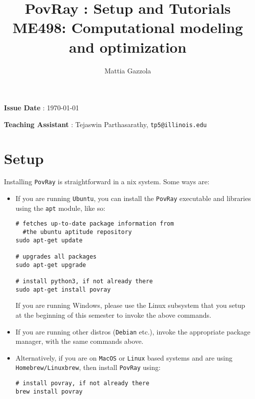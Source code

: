 \documentclass[11pt]{article}
\author{Mattia Gazzola}
\date{}
\title{PovRay : Setup and Tutorials\\\medskip
\large ME498: Computational modeling and optimization}
\begin{document}
\maketitle
\textbf{Issue Date} : \today

\textbf{Teaching Assistant} : Tejaswin Parthasarathy, \texttt{tp5@illinois.edu}

\section{Setup}
\label{sec:org9167742}
Installing \texttt{PovRay} is straightforward in a nix system. Some ways are:

\begin{itemize}
\item If you are running \texttt{Ubuntu}, you can install the \texttt{PovRay} executable and
libraries using the \texttt{apt} module, like so:

\begin{verbatim}
# fetches up-to-date package information from
  #the ubuntu aptitude repository
sudo apt-get update

# upgrades all packages
sudo apt-get upgrade

# install python3, if not already there
sudo apt-get install povray
\end{verbatim}
If you are running Windows, please use the Linux subsystem that you setup at
the beginning of this semester to invoke the above commands.

\item If you are running other distros (\texttt{Debian} etc.), invoke the appropriate package
manager, with the same commands above.

\item Alternatively, if you are on \texttt{MacOS} or \texttt{Linux} based systems and are using
\texttt{Homebrew/Linuxbrew}, then install \texttt{PovRay} using:
\begin{verbatim}
# install povray, if not already there
brew install povray
\end{verbatim}
\end{itemize}
\end{document}
